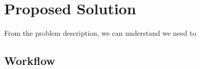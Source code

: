 
\section{Proposed Solution}
\label{sec:solution}

From the problem description, we can understand we need to 

%


\subsection{Workflow}
\label{subsec:SystemWorkflow}
